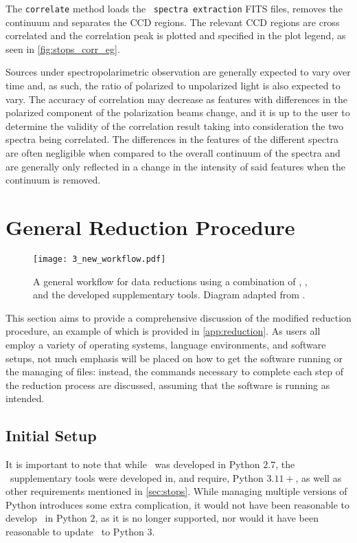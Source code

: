 The \texttt{correlate} method loads the \polsalt\ \texttt{spectra extraction} \gls{FITS} files, removes the continuum and separates the \gls{CCD} regions. The relevant \gls{CCD} regions are cross correlated and the correlation peak is plotted and specified in the plot legend, as seen in \autoref{fig:stops_corr_eg}.

Sources under spectropolarimetric observation are generally expected to vary over time and, as such, the ratio of polarized to unpolarized light is also expected to vary. The accuracy of correlation may decrease as features with differences in the polarized component of the polarization beams change, and it is up to the user to determine the validity of the correlation result taking into consideration the two spectra being correlated. The differences in the features of the different spectra are often negligible when compared to the overall continuum of the spectra and are generally only reflected in a change in the intensity of said features when the continuum is removed.

\section{General Reduction Procedure}\label{sec:red_proc}

\begin{figure}[t]
    \centering
    \texttt{[image: 3\_new\_workflow.pdf]}
    \caption{A general workflow for data reductions using a combination of \polsalt, \iraf, and the developed supplementary tools. Diagram adapted from \cite{cooper_HEASA2022}.}
    \label{fig:new_workflow}
\end{figure}

This section aims to provide a comprehensive discussion of the modified reduction procedure, an example of which is provided in \autoref{app:reduction}. As users all employ a variety of operating systems, language environments, and software setups, not much emphasis will be placed on how to get the software running or the managing of files: instead, the commands necessary to complete each step of the reduction process are discussed, assuming that the software is running as intended.

\subsection{Initial Setup} \label{subsec:reduc_setup}

It is important to note that while \polsalt\ was developed in Python $2.7$, the \stops\ supplementary tools were developed in, and require, Python $3.11+$, as well as other requirements mentioned in \autoref{sec:stops}. While managing multiple versions of Python introduces some extra complication, it would not have been reasonable to develop \stops\ in Python $2$, as it is no longer supported, nor would it have been reasonable to update \polsalt\ to Python $3$.

